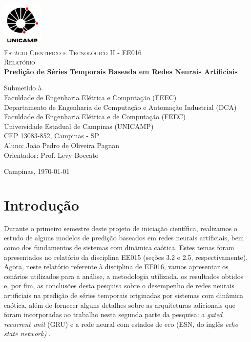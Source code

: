 \documentclass[a4paper, 12pt]{article}
\begin{document}
\begin{titlepage}
\newcommand{\HRule}{\rule{\linewidth}{1.5mm}}
	
\center

\includegraphics[width=0.15\textwidth]{logo-unicamp.pdf}\\[1.0cm]

\textsc{\Large Estágio Científico e Tecnológico II - EE016}\\[0.5cm]

\textsc{\large Relatório}\\[1.5cm]

{\Large \bfseries Predição de Séries Temporais Baseada em Redes Neurais Artificiais}\\[2.5cm]

\begin{flushleft}
Submetido à \\ Faculdade de Engenharia Elétrica e Computação (FEEC)\\[1.5cm]

Departamento de Engenharia de Computação e Automação Industrial (DCA)\\
Faculdade de Engenharia Elétrica e de Computação (FEEC)\\
Universidade Estadual de Campinas (UNICAMP)\\
CEP 13083-852, Campinas - SP\\[1.0cm]

Aluno: João Pedro de Oliveira Pagnan\\
Orientador: Prof. Levy Boccato \\[4.5cm]
\end{flushleft}	
	
Campinas, \today

\end{titlepage}

\newpage

\section{Introdução}

Durante o primeiro semestre deste projeto de iniciação científica, realizamos o estudo de alguns modelos de predição baseados em redes neurais artificiais, bem como dos fundamentos de sistemas com dinâmica caótica. Estes temas foram apresentados no relatório da disciplina EE015 (seções 3.2 e 2.5, respectivamente). Agora, neste relatório referente à disciplina de EE016, vamos apresentar os cenários utilizados para a análise, a metodologia utilizada, os resultados obtidos e, por fim, as conclusões desta pesquisa sobre o desempenho de redes neurais artificiais na predição de séries temporais originadas por sistemas com dinâmica caótica, além de fornecer alguns detalhes sobre as arquiteturas adicionais que foram incorporadas ao trabalho nesta segunda parte da pesquisa: a \textit{gated recurrent unit} (GRU) \cite{cho2014learning} e a rede neural com estados de eco (ESN, do inglês \textit{echo state network)} \cite{jaeger2007echo}.
\end{document}
